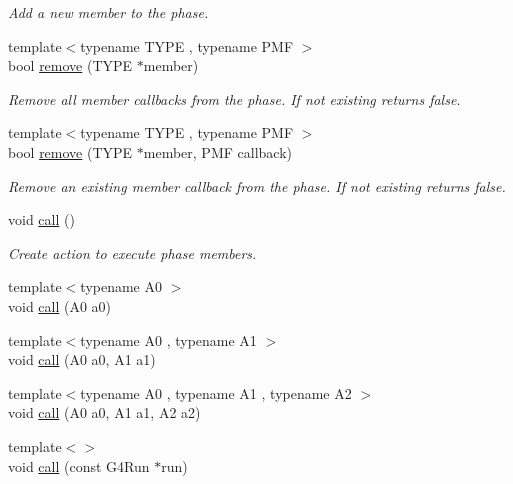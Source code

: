 \begin{DoxyCompactItemize}
\begin{DoxyCompactList}\small\item\em Add a new member to the phase. \end{DoxyCompactList}\item 
{\footnotesize template$<$typename T\+Y\+PE , typename P\+MF $>$ }\\bool \hyperlink{class_d_d4hep_1_1_simulation_1_1_geant4_action_phase_ae0e3c1feb01b893930ac86603f3b08de}{remove} (T\+Y\+PE $\ast$member)
\begin{DoxyCompactList}\small\item\em Remove all member callbacks from the phase. If not existing returns false. \end{DoxyCompactList}\item 
{\footnotesize template$<$typename T\+Y\+PE , typename P\+MF $>$ }\\bool \hyperlink{class_d_d4hep_1_1_simulation_1_1_geant4_action_phase_a286f026ed98f51673c3570d54e215105}{remove} (T\+Y\+PE $\ast$member, P\+MF callback)
\begin{DoxyCompactList}\small\item\em Remove an existing member callback from the phase. If not existing returns false. \end{DoxyCompactList}\item 
void \hyperlink{class_d_d4hep_1_1_simulation_1_1_geant4_action_phase_ae0022a7ef73336336dc256644bd06a12}{call} ()
\begin{DoxyCompactList}\small\item\em Create action to execute phase members. \end{DoxyCompactList}\item 
{\footnotesize template$<$typename A0 $>$ }\\void \hyperlink{class_d_d4hep_1_1_simulation_1_1_geant4_action_phase_a2cc1ad0196e940182ab25717bceabe57}{call} (A0 a0)
\item 
{\footnotesize template$<$typename A0 , typename A1 $>$ }\\void \hyperlink{class_d_d4hep_1_1_simulation_1_1_geant4_action_phase_aff7a51f948ba6d673b1411032096a109}{call} (A0 a0, A1 a1)
\item 
{\footnotesize template$<$typename A0 , typename A1 , typename A2 $>$ }\\void \hyperlink{class_d_d4hep_1_1_simulation_1_1_geant4_action_phase_a4b3a668313dcbc74b3c739ffa832ce33}{call} (A0 a0, A1 a1, A2 a2)
\item 
{\footnotesize template$<$$>$ }\\void \hyperlink{class_d_d4hep_1_1_simulation_1_1_geant4_action_phase_a48db97b858e89fa3a616146de4f54658}{call} (const G4\+Run $\ast$run)

\end{DoxyCompactItemize}
